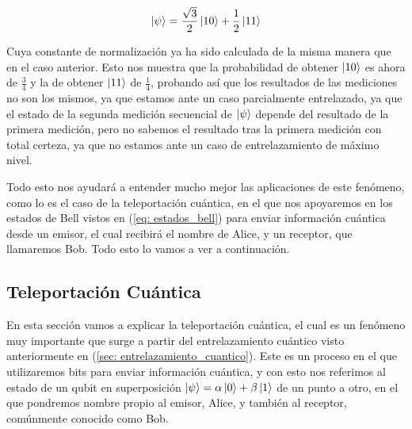 \documentclass[12pt]{article}
\numberwithin{equation}{section} %
\begin{document}
    \begin{equation*}
        \ket{\psi} = \frac{\sqrt{3}}{2} \ket{1 0} + \frac{1}{2} \ket{1 1}
    \end{equation*}

    \vspace{2.5mm}

    Cuya constante de normalización ya ha sido calculada de la misma manera que en el caso anterior. Esto nos muestra que la probabilidad de obtener \( \ket{1 0} \) es ahora de \( \frac{3}{4} \) y la de obtener \( \ket{1 1} \) de \( \frac{1}{4} \), probando así que los resultados de las mediciones no son los mismos, ya que estamos ante un caso parcialmente entrelazado, ya que el estado de la segunda medición secuencial de \( \ket{\psi} \) depende del resultado de la primera medición, pero no sabemos el resultado tras la primera medición con total certeza, ya que no estamos ante un caso de entrelazamiento de máximo nivel.

    \vspace{5mm}

    Todo esto nos ayudará a entender mucho mejor las aplicaciones de este fenómeno, como lo es el caso de la teleportación cuántica, en el que nos apoyaremos en los estados de Bell vistos en (\ref{eq: estados_bell}) para enviar información cuántica desde un emisor, el cual recibirá el nombre de Alice, y un receptor, que llamaremos Bob. Todo esto lo vamos a ver a continuación.

    \vspace{5mm}





    \subsection{Teleportación Cuántica}\label{subsection: teleportacion_cuantica}

    \vspace{5mm}

    En esta sección vamos a explicar la teleportación cuántica, el cual es un fenómeno muy importante que surge a partir del entrelazamiento cuántico visto anteriormente en (\ref{sec: entrelazamiento_cuantico}). Este es un proceso en el que utilizaremos bits para enviar información cuántica, y con esto nos referimos al estado de un qubit en superposición \( \ket{\psi} = \alpha \ket{0} + \beta \ket{1} \) de un punto a otro, en el que pondremos nombre propio al emisor, Alice, y también al receptor, comúnmente conocido como Bob.
\end{document}
